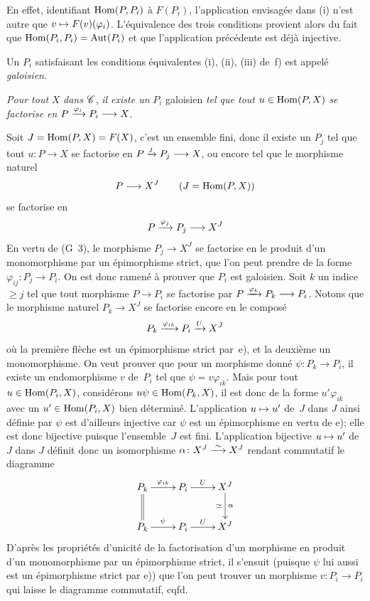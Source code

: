 \begin{enumerateb}
En effet, identifiant $\operatorname{Hom}(P,P_i)$ \`a $F(P_i)$, l'application
envisag\'ee dans (i) n'est autre que $v \mto
F(v)(\varphi_i)$. L'\'equivalence des trois conditions provient
alors du fait que $\operatorname{Hom}(P_i,P_i)=\operatorname{Aut}(P_i)$ et que l'application
pr\'ec\'edente est d\'ej\`a injective.

Un $P_i$ satisfaisant les conditions \'equivalentes
(i), (ii), (iii)
de~f) est appel\'e \emph{galoisien}.
\item[g)] \emph{Pour tout} $X$ \emph{dans} $\cal{C}$, \emph{il existe
un} $P_i$ galoisien \emph{tel que tout} $u \in \operatorname{Hom}(P,X)$ \emph{se
factorise en} $P \xrightarrow{\varphi_i} P_i \longrightarrow X$.

Soit $J=\operatorname{Hom}(P,X)=F(X)$, c'est un ensemble fini, donc il existe un
$P_j$ tel que tout $u \colon P \to X$ se factorise en $P\xrightarrow{j}P_j\longrightarrow X$, ou encore tel que le morphisme naturel
$$
P \to X^J \qquad (J=\Hom(P,X))
$$
se factorise en
$$
P \lto{\varphi_j} P_j \to X^J
$$
En
vertu de (G~3), le morphisme $P_j \to X^J$ se factorise en le produit
d'un monomorphisme par un \'epimorphisme strict, que l'on peut
prendre de la forme $\varphi_{ij} \colon P_j \to P_i$. On est donc
ramen\'e \`a prouver que $P_i$ est galoisien. Soit $k$ un indice
$\geq j$ tel que tout morphisme $P \to P_i$ se factorise par
$P \xrightarrow{\varphi_k} P_k \longrightarrow P_i$. Notons que le
morphisme naturel $P_k \to X^J$ se factorise encore en le compos\'e
$$
P_k \xrightarrow{\varphi_{ik}} P_i \xrightarrow{U} X^J
$$
o\`u la premi\`ere fl\`eche est un \'epimorphisme strict
par~e), et la deuxi\`eme un monomorphisme. On veut prouver que pour
un morphisme donn\'e $\psi \colon P_k \to P_i$, il existe un
endomorphisme $v$ de~$P_i$ tel que $\psi = v \varphi_{ik}$. Mais pour
tout $u \in \operatorname{Hom}(P_i,X)$, consid\'erons $u \psi \in \operatorname{Hom}(P_k,X)$,
il est donc de la forme $u'\varphi_{ik}$ avec un $u' \in \operatorname{Hom}(P_i,X)$
bien d\'etermin\'e. L'application $u \mto u'$ de~$J$ dans $J$
ainsi d\'efinie par $\psi$ est d'ailleurs injective car $\psi$ est
un \'epimorphisme en vertu de e); elle est donc bijective puisque
l'ensemble~$J$ est fini. L'application bijective $u \mto u'$ de~$J$
dans $J$ d\'efinit donc un isomorphisme $\alpha \colon X^J \overset{\sim}{\longrightarrow}
X^J$ rendant commutatif le diagramme
$$
\xymatrix{{P_k}\ar[r]^-{\varphi_{ik}}\ar@{=}[d]&{P_i}\ar[r]^-U&{X^J}\ar[d]^-{\alpha}_-{\simeq}\\{P_k}\ar[r]^{\psi}&{P_i}\ar[r]^-U&{X^J}}
$$
D'apr\`es les propri\'et\'es d'unicit\'e de la factorisation
d'un morphisme en produit d'un monomorphisme par un \'epimorphisme
strict, il s'ensuit (puisque $\psi$ lui aussi est un \'epimorphisme
strict par e)) que l'on peut trouver un morphisme $v \colon P_i \to
P_i$ qui laisse le diagramme commutatif, cqfd.


\end{enumerateb}
